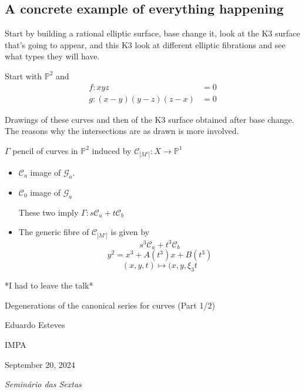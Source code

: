 \subsection{A concrete example of everything happening}

Start by building a rational elliptic surface, base change it, look at the K3 surface that's going to appear, and this K3 look at different elliptic fibrations and see what types they will have.

Start with $\mathbb{P}^2$ and
\begin{align*}
	f:xyz&=0\\
	g:(x-y)(y-z)(z-x)&=0
\end{align*}

Drawings of these curves and then of the K3 surface obtained after base change. The reasons why the intersections are as drawn is more involved.

$\Gamma$ pencil of curves in $\mathbb{P}^2$ induced by $\mathcal{C}_{|M'|}:X\to \mathbb{P}^1$ 
\begin{itemize}
\item $\mathcal{C}_{a}$ image of $\mathcal{G}_{a}$.

\item $\mathcal{C}_{0}$ image of $\mathcal{G}_{a}$ 

	These two imply $\Gamma:s\mathcal{C}_{a}+t\mathcal{C}_{b}$ 

\item The generic fibre of $\mathcal{C}_{|M'|}$ is given by
	\[s^3\mathcal{C}_a+t^3\mathcal{C}_b\]
	\[y^2=x^3+A(t^3)x+B(t^3)\]
	\[(x,y,t)\mapsto (x,y,\xi_3t\]
\end{itemize}

*I had to leave the talk*



\clearpage{}
{\Huge Degenerations of the canonical series for curves (Part 1/2)}

\hfill{\Large Eduardo Esteves}

{\Large \hfill IMPA}

\hfill{\large September 20, 2024

\hfill \textit{Seminário das Sextas}}

